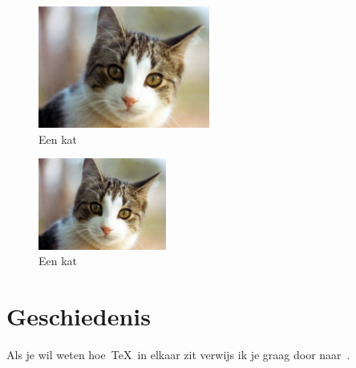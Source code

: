\documentclass[a4paper]{article}
\begin{document}
\begin{figure}[t]
  \centering
  \includegraphics[height=4cm]{cat.jpg}
  \caption{Een kat}
  \label{figure:cat}
\end{figure}

\begin{figure}[b]
  \centering
  \includegraphics[height=3cm]{cat.jpg}
  \caption{Een kat}
  \label{figure:cat-2}
\end{figure}

\section{Geschiedenis}
Als je wil weten hoe~\TeX\ in elkaar zit verwijs ik je graag door naar~\cite{texbook}.



\end{document}
